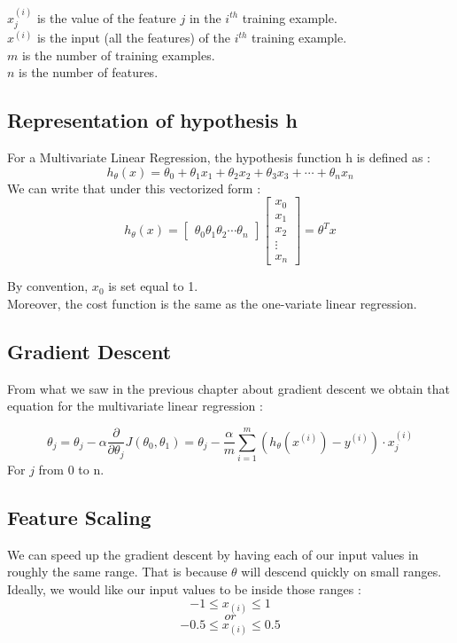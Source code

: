 \documentclass{article}
\begin{document}
$x^{(i)}_j$ is the value of the feature $j$ in the $i^{th}$ training example.\\
$x^{(i)}$ is the input (all the features) of the $i^{th}$ training example.\\
$m$ is the number of training examples.\\
$n$ is the number of features.

\subsection{Representation of hypothesis h}
For a Multivariate Linear Regression, the hypothesis function h is defined as : 
	$$h_\theta(x) = \theta_0 + \theta_1x_1 + \theta_2x_2 + \theta_3x_3 + \cdots + \theta_n x_n$$
We can write that under this vectorized form :
$$h_\theta(x) = {\begin{bmatrix}\theta_{0} \theta_{1} \theta_{2} \cdots \theta_{n}\end{bmatrix}
\begin{bmatrix}
	x_{0} \\
	x_{1} \\
	x_{2} \\
	\vdots \\
	x_{n}
\end{bmatrix}} = \theta^Tx$$

By convention, $x_{0}$ is set equal to 1.\\
Moreover, the cost function is the same as the one-variate linear regression.

\subsection{Gradient Descent}
From what we saw in the previous chapter about gradient descent we obtain that equation for the multivariate linear regression :

$$\theta_j =  \theta_j - \alpha \frac{\partial}{\partial\theta_j}J(\theta_0, \theta_1) = \theta_j - \frac{\alpha}{m}\sum_{i=1}^{m}(h_{\theta}(x^{(i)})-y^{(i)})\cdot x^{(i)}_{j}$$
For $j$ from 0 to n.

\subsection{Feature Scaling}

We can speed up the gradient descent by having each of our input values in roughly the same range. That is because $\theta$ will descend quickly on small ranges. Ideally, we would like our input values to be inside those ranges :\\

$$-1 \leq x_{(i)} \leq 1$$
$$or$$
$$-0.5 \leq x_{(i)} \leq 0.5$$
\end{document}
